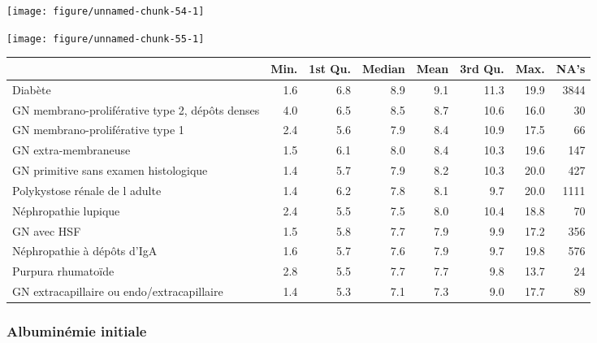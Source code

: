\documentclass[11pt,a4paper]{article}\usepackage[]{graphicx}\usepackage[]{color}
\makeatletter
\def\maxwidth{ %
  \ifdim\Gin@nat@width>\linewidth
    \linewidth
  \else
    \Gin@nat@width
  \fi
}
\newenvironment{knitrout}{}{} %
\makeatother
\begin{document}
\begin{knitrout}
\color{fgcolor}
\texttt{[image: figure/unnamed-chunk-54-1]} 

\end{knitrout}

\begin{knitrout}
\color{fgcolor}
\texttt{[image: figure/unnamed-chunk-55-1]} 

\end{knitrout}


\begin{table}[H]
\centering
\begingroup\small
\begin{tabular}{lrrrrrrr}
  \hline
 & Min. & 1st Qu. & Median & Mean & 3rd Qu. & Max. & NA's \\ 
  \hline
Diabète & 1.6 & 6.8 & 8.9 & 9.1 & 11.3 & 19.9 & 3844 \\ 
  GN membrano-proliférative type 2, dépôts denses & 4.0 & 6.5 & 8.5 & 8.7 & 10.6 & 16.0 & 30 \\ 
  GN membrano-proliférative type 1 & 2.4 & 5.6 & 7.9 & 8.4 & 10.9 & 17.5 & 66 \\ 
  GN extra-membraneuse & 1.5 & 6.1 & 8.0 & 8.4 & 10.3 & 19.6 & 147 \\ 
  GN primitive sans examen histologique & 1.4 & 5.7 & 7.9 & 8.2 & 10.3 & 20.0 & 427 \\ 
  Polykystose rénale de l adulte & 1.4 & 6.2 & 7.8 & 8.1 & 9.7 & 20.0 & 1111 \\ 
  Néphropathie lupique & 2.4 & 5.5 & 7.5 & 8.0 & 10.4 & 18.8 & 70 \\ 
  GN avec HSF & 1.5 & 5.8 & 7.7 & 7.9 & 9.9 & 17.2 & 356 \\ 
  Néphropathie à dépôts d'IgA & 1.6 & 5.7 & 7.6 & 7.9 & 9.7 & 19.8 & 576 \\ 
  Purpura rhumatoïde & 2.8 & 5.5 & 7.7 & 7.7 & 9.8 & 13.7 & 24 \\ 
  GN extracapillaire ou endo/extracapillaire & 1.4 & 5.3 & 7.1 & 7.3 & 9.0 & 17.7 & 89 \\ 
   \hline
\end{tabular}
\endgroup
\end{table}


\subsubsection*{Albuminémie initiale}
\end{document}
